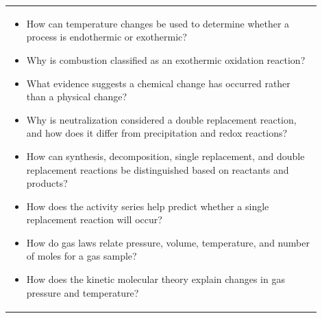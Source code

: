 \documentclass{article}
\begin{document}
\begin{tabular}{|p{0.9\linewidth}|}
\hline
\begin{itemize}
    \item How can temperature changes be used to determine whether a process is endothermic or exothermic?
    \item Why is combustion classified as an exothermic oxidation reaction?
    \item What evidence suggests a chemical change has occurred rather than a physical change?
    \item Why is neutralization considered a double replacement reaction, and how does it differ from precipitation and redox reactions?
    \item How can synthesis, decomposition, single replacement, and double replacement reactions be distinguished based on reactants and products?
    \item How does the activity series help predict whether a single replacement reaction will occur?
    \item How do gas laws relate pressure, volume, temperature, and number of moles for a gas sample?
    \item How does the kinetic molecular theory explain changes in gas pressure and temperature?
\end{itemize}\\[0.2cm]
\end{tabular}
\newpage
\end{document}
